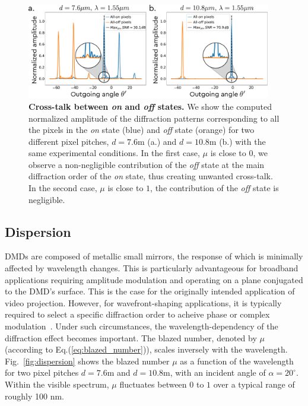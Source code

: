 \documentclass[12pt]{iopart}
\begin{document}
\begin{figure}
  \centering
  \includegraphics[width = 0.95\textwidth]{images/xtalk.pdf}
  \caption{
    \textbf{Cross-talk between {\em on} and {\em off} states.}
    We show the computed normalized amplitude of the diffraction patterns corresponding
    to all the pixels in the {\em on} state (blue)
    and {\em off} state (orange)
    for two different pixel pitches,
    $d = 7.6$\textmu m (a.)
    and $d = 10.8$\textmu m (b.)
    with the same experimental conditions.
    In the first case, $\mu$ is close to $0$,
    we observe a non-negligible contribution of the {\em off} state
    at the main diffraction order of the {\em on} state,
    thus creating unwanted cross-talk.
    In the second case, $\mu$ is close to $1$,
    the contribution of the {\em off} state is negligible.
  }
  \label{fig:xtalk}
\end{figure}

\subsection{Dispersion}


DMDs are composed of metallic small mirrors,
the response of which is minimally affected by wavelength changes.
This is particularly advantageous for broadband applications requiring amplitude modulation
and operating on a plane conjugated to the DMD's surface.
This is the case for the originally intended application of video projection.
However, for wavefront-shaping applications,
it is typically required to select a specific diffraction order
to acheive phase or complex modulation~\cite{lee1979binary,Gutierrez2024DMD}.
Under such circumstances,
the wavelength-dependency of the diffraction effect becomes important.
The blazed number, denoted by $\mu$ (according to Eq.(\ref{eq:blazed_number})),
scales inversely with the wavelength.
Fig.~\ref{fig:dispersion} shows the blazed number $\mu$
as a function of the wavelength for two pixel pitches $d=7.6$\textmu m and $d=10.8$\textmu m,
with an incident angle of $\alpha = 20^\circ$.
Within the visible spectrum, $\mu$ fluctuates between $0$ to $1$ over a typical range of roughly 100 nm.\\
\end{document}
